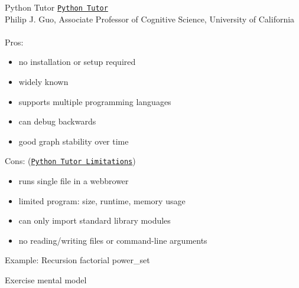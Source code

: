 \documentclass[10pt, colorlinks=true, urlcolor=blue]{beamer}
\begin{document}
\begin{frame}{Python Tutor}
  \href{https://pythontutor.com/}{\texttt{Python Tutor}}\\ 
  Philip J. Guo, Associate Professor of Cognitive Science, University of California\\
  \vspace{1em}\\
  Pros:
  \begin{itemize}
  \item no installation or setup required
  \item widely known
  \item supports multiple programming languages
  \item can debug backwards
  \item good graph stability over time
  \end{itemize}
  Cons: (\href{https://docs.google.com/document/d/13_Bc-l2FKMgwPx4dZb0sv7eMfYMHhRVgBRShha8kgbU/}{\texttt{Python Tutor Limitations}})
  \begin{itemize}
  \item runs single file in a webbrower
  \item limited program: size, runtime, memory usage
  \item can only import standard library modules
  \item no reading/writing files or command-line arguments
  \end{itemize}
\end{frame}

\begin{frame}{Example: Recursion}
  factorial
  power\_set
\end{frame}

\begin{frame}{Exercise}
  mental model
\end{frame}
\end{document}
